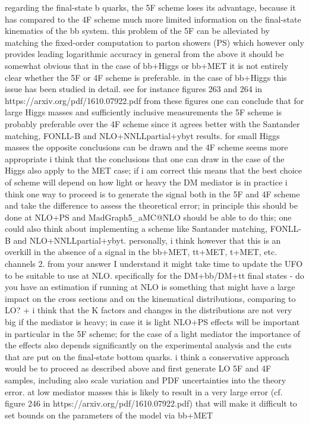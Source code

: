 regarding the final-state b quarks, the 5F scheme loses its advantage,
because it has compared to the 4F scheme much more limited information
on the final-state kinematics of the bb system. this problem of the 5F
can be alleviated by matching the fixed-order computation to parton
showers (PS) which however only provides leading logarithmic accuracy in
general from the above it should be somewhat obvious that in the case of
bb+Higgs or bb+MET it is not entirely clear whether the 5F or 4F scheme
is preferable. in the case of bb+Higgs this issue has been studied in
detail. see for instance figures 263 and 264 in
https://arxiv.org/pdf/1610.07922.pdf from these figures one can conclude
that for large Higgs masses and sufficiently inclusive measurements the
5F scheme is probably preferable over the 4F scheme since it agrees
better with the Santander matching, FONLL-B and NLO+NNLLpartial+ybyt
results. for small Higgs masses the opposite conclusions can be drawn
and the 4F scheme seems more appropriate i think that the conclusions
that one can draw in the case of the Higgs also apply to the MET case;
if i am correct this means that the best choice of scheme will depend on
how light or heavy the DM mediator is in practice i think one way to
proceed is to generate the signal both in the 5F and 4F scheme and take
the difference to assess the theoretical error; in principle this should
be done at NLO+PS and MadGraph5\_aMC@NLO should be able to do this; one
could also think about implementing a scheme like Santander matching,
FONLL-B and NLO+NNLLpartial+ybyt. personally, i think however that this
is an overkill in the absence of a signal in the bb+MET, tt+MET, t+MET,
etc. channels 2. from your answer I understand it might take time to
update the UFO to be suitable to use at NLO. specifically for the
DM+bb/DM+tt final states - do you have an estimation if running at NLO
is something that might have a large impact on the cross sections and on
the kinematical distributions, comparing to LO? + i think that the K
factors and changes in the distributions are not very big if the
mediator is heavy; in case it is light NLO+PS effects will be important
in particular in the 5F scheme; for the case of a light mediator the
importance of the effects also depends significantly on the experimental
analysis and the cuts that are put on the final-state bottom quarks. i
think a conservative approach would be to proceed as described above and
first generate LO 5F and 4F samples, including also scale variation and
PDF uncertainties into the theory error. at low mediator masses this is
likely to result in a very large error (cf. figure 246 in
https://arxiv.org/pdf/1610.07922.pdf) that will make it difficult to set
bounds on the parameters of the model via bb+MET

